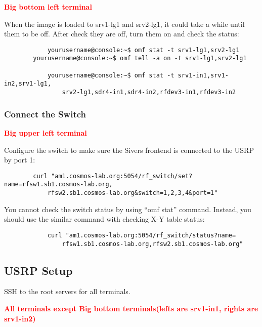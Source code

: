 \documentclass{article}
\begin{document}
            
            \textbf{\textcolor{red}{Big bottom left terminal}}
            
            When the image is loaded to srv1-lg1 and srv2-lg1, it could take a while until them to be off. After check they are off, turn them on and check the status:
            \begin{verbatim}
            yourusername@console:~$ omf stat -t srv1-lg1,srv2-lg1
        yourusername@console:~$ omf tell -a on -t srv1-lg1,srv2-lg1

            yourusername@console:~$ omf stat -t srv1-in1,srv1-in2,srv1-lg1,
                srv2-lg1,sdr4-in1,sdr4-in2,rfdev3-in1,rfdev3-in2
            \end{verbatim}
            
            
        
        
    
        \subsubsection{Connect the Switch} \label{sec: 60ghzTutorial - Connect Switch}
        \textbf{\textcolor{red}{Big upper left terminal}}
        
            Configure the switch to make sure the Sivers frontend is connected to the USRP by port 1:
            \begin{verbatim}
        curl "am1.cosmos-lab.org:5054/rf_switch/set?name=rfsw1.sb1.cosmos-lab.org,
            rfsw2.sb1.cosmos-lab.org&switch=1,2,3,4&port=1"
            \end{verbatim}
        
            You cannot check the switch status by using ``omf stat'' command. Instead, you should use the similar command with checking X-Y table status:
            \begin{verbatim}
            curl "am1.cosmos-lab.org:5054/rf_switch/status?name=
                rfsw1.sb1.cosmos-lab.org,rfsw2.sb1.cosmos-lab.org"
            \end{verbatim}        

            
    \subsection{USRP Setup}
        SSH to the root servers for all terminals. 

        \textbf{\textcolor{red}{All terminals except Big bottom terminals(lefts are srv1-in1, rights are srv1-in2)}}
\end{document}
